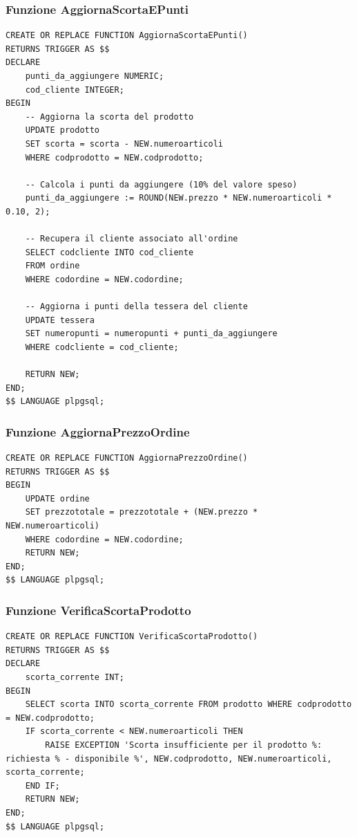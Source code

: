 \documentclass[a4paper,12pt]{article}
\begin{document}
\subsubsection*{Funzione AggiornaScortaEPunti}
\vspace{1.5em}
\begin{lstlisting}[style=sqlstyle]
CREATE OR REPLACE FUNCTION AggiornaScortaEPunti()
RETURNS TRIGGER AS $$
DECLARE
    punti_da_aggiungere NUMERIC;
    cod_cliente INTEGER;
BEGIN
    -- Aggiorna la scorta del prodotto
    UPDATE prodotto
    SET scorta = scorta - NEW.numeroarticoli
    WHERE codprodotto = NEW.codprodotto;

    -- Calcola i punti da aggiungere (10% del valore speso)
    punti_da_aggiungere := ROUND(NEW.prezzo * NEW.numeroarticoli * 0.10, 2);

    -- Recupera il cliente associato all'ordine
    SELECT codcliente INTO cod_cliente
    FROM ordine
    WHERE codordine = NEW.codordine;

    -- Aggiorna i punti della tessera del cliente
    UPDATE tessera
    SET numeropunti = numeropunti + punti_da_aggiungere
    WHERE codcliente = cod_cliente;

    RETURN NEW;
END;
$$ LANGUAGE plpgsql;
\end{lstlisting}
\vspace{1.5em}

\subsubsection*{Funzione AggiornaPrezzoOrdine}
\vspace{1.5em}
\begin{lstlisting}[style=sqlstyle]
CREATE OR REPLACE FUNCTION AggiornaPrezzoOrdine()
RETURNS TRIGGER AS $$
BEGIN
    UPDATE ordine
    SET prezzototale = prezzototale + (NEW.prezzo * NEW.numeroarticoli)
    WHERE codordine = NEW.codordine;
    RETURN NEW;
END;
$$ LANGUAGE plpgsql;
\end{lstlisting}
\vspace{1.5em}

\subsubsection*{Funzione VerificaScortaProdotto}
\vspace{1.5em}
\begin{lstlisting}[style=sqlstyle]
CREATE OR REPLACE FUNCTION VerificaScortaProdotto()
RETURNS TRIGGER AS $$
DECLARE
    scorta_corrente INT;
BEGIN
    SELECT scorta INTO scorta_corrente FROM prodotto WHERE codprodotto = NEW.codprodotto;
    IF scorta_corrente < NEW.numeroarticoli THEN
        RAISE EXCEPTION 'Scorta insufficiente per il prodotto %: richiesta % - disponibile %', NEW.codprodotto, NEW.numeroarticoli, scorta_corrente;
    END IF;
    RETURN NEW;
END;
$$ LANGUAGE plpgsql;
\end{lstlisting}
\vspace{1.5em}
\end{document}
